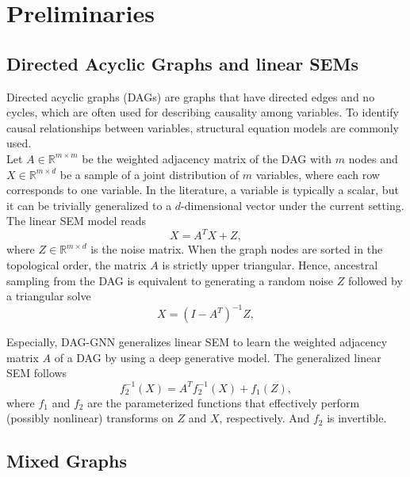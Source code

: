 \documentclass[10pt]{article}
\begin{document}
\section{Preliminaries}

\subsection{Directed Acyclic Graphs and linear SEMs}

Directed acyclic graphs (DAGs) are graphs that have directed edges and no cycles, which are often used for describing causality among variables. To identify causal relationships between variables, structural equation models are commonly used.\\

Let $A \in \mathbb{R}^{m \times m}$ be the weighted adjacency matrix of the DAG with $m$ nodes and $X \in \mathbb{R}^{m \times d}$ be a sample of a joint distribution of $m$ variables, where each row corresponds to one variable. In the literature, a variable is typically a scalar, but it can be trivially generalized to a $d$-dimensional vector under the current setting. The linear SEM model reads
\begin{equation}
X = A^TX + Z,
\end{equation}
where $Z \in \mathbb{R}^{m \times d}$ is the noise matrix. When the graph nodes are sorted in the topological order, the matrix $A$ is strictly upper triangular. Hence, ancestral sampling from the DAG is equivalent to generating a random noise $Z$ followed by a triangular solve
\begin{equation}
X = (I - A^T)^{-1}Z,
\end{equation}

Especially, DAG-GNN generalizes linear SEM to learn the weighted adjacency matrix $A$ of a DAG by using a deep generative model\cite{yu2019daggnn}. The generalized linear SEM follows
\begin{equation}
    f_2^{-1}(X) = A^Tf_2^{-1}(X) + f_1(Z),
\end{equation}
where $f_1$ and $f_2$ are the parameterized functions that effectively perform (possibly nonlinear) transforms on $Z$ and $X$, respectively. And $f_2$ is invertible.



\subsection{Mixed Graphs}
\end{document}
